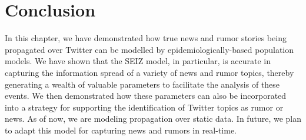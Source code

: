 \section{Conclusion}
In this chapter, we have demonstrated how true news and rumor stories being propagated over Twitter can be modelled by epidemiologically-based population models. We have shown that the SEIZ model, in particular, is accurate in capturing the information spread of a variety of news and rumor topics, thereby generating a wealth of valuable parameters to facilitate the analysis of these events. We then demonstrated how these parameters can also be incorporated into a strategy for supporting the identification of Twitter topics as rumor or news. As of now, we are modeling propagation over static data. In future, we plan to adapt this model for capturing news and rumors in real-time.




